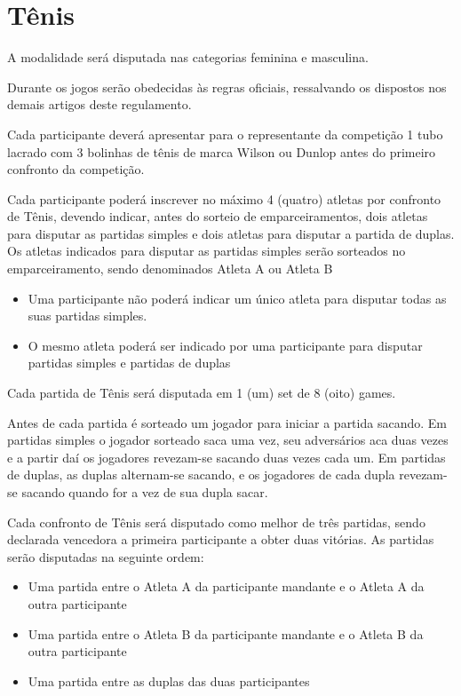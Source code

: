 {\let\clearpage\relax \chapter{Tênis}}

\begin{article}
	A modalidade será disputada nas categorias feminina e masculina.
\end{article}

\begin{article}
	Durante os jogos serão obedecidas às regras oficiais, ressalvando os dispostos nos demais artigos deste regulamento.
\end{article}

\begin{article}
	Cada participante deverá apresentar para o representante da competição 1 tubo lacrado com 3 bolinhas de tênis de marca Wilson ou Dunlop antes do primeiro confronto da competição.
\end{article}

\begin{article}
	Cada participante poderá inscrever no máximo 4 (quatro) atletas por confronto de Tênis, devendo indicar, antes do sorteio de emparceiramentos, dois atletas para disputar as partidas simples e dois atletas para disputar a partida de duplas. Os atletas indicados para disputar as partidas simples serão sorteados no emparceiramento, sendo denominados Atleta A ou Atleta B

	\begin{itemize}[noitemsep]
		\item Uma participante não poderá indicar um único atleta para disputar todas as suas partidas simples.
		\item O mesmo atleta poderá ser indicado por uma participante para disputar partidas simples e partidas de duplas
	\end{itemize}

	Cada partida de Tênis será disputada em 1 (um) set de 8 (oito) games.
\end{article}

\noindent
Antes de cada partida é sorteado um jogador para iniciar a partida sacando. Em partidas simples o jogador sorteado saca uma vez, seu adversários aca duas vezes e a partir daí os jogadores revezam-se sacando duas vezes cada um. Em partidas de duplas, as duplas alternam-se sacando, e os jogadores de cada dupla revezam-se sacando quando for a vez de sua dupla sacar.

\noindent
Cada confronto de Tênis será disputado como melhor de três partidas, sendo declarada vencedora a primeira participante a obter duas vitórias. As partidas serão disputadas na seguinte ordem:
\begin{itemize}[noitemsep]
	\item Uma partida entre o Atleta A da participante mandante e o Atleta A da outra participante
	\item Uma partida entre o Atleta B da participante mandante e o Atleta B da outra participante
	\item Uma partida entre as duplas das duas participantes
\end{itemize}

